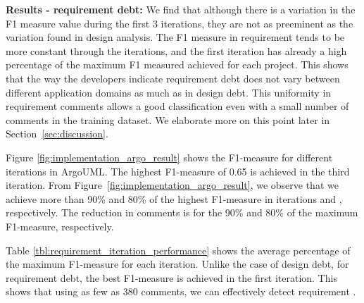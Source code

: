 \noindent \textbf{Results - requirement debt:} We find that although there is a variation in the F1 measure value during the first 3 iterations, they are not as preeminent as the variation found in design \SATD analysis. The F1 measure in requirement \SATD tends to be more constant through the iterations, and the first iteration has already a high percentage of the maximum F1 measured achieved for each project. This shows that the way the developers indicate requirement debt does not vary between different application domains as much as in design debt. This uniformity in requirement \SATD comments allows a good classification even with a small number of comments in the training dataset. We elaborate more on this point later in Section~\ref{sec:discussion}.

Figure \ref{fig:implementation_argo_result}  shows the F1-measure for different iterations in ArgoUML. The highest F1-measure of 0.65  is achieved in the third iteration. From Figure~\ref{fig:implementation_argo_result}, we observe that we achieve more than 90\% and 80\% of the highest F1-measure in iterations  and , respectively. The reduction in comments is  for the 90\% and 80\% of the maximum F1-measure, respectively.


Table \ref{tbl:requirement_iteration_performance} shows the average percentage of the maximum F1-measure for each iteration. Unlike the case of design debt, for requirement debt, the best F1-measure is achieved in the first iteration. This shows that using as few as 380 comments, we can effectively detect requirement \SATD.


